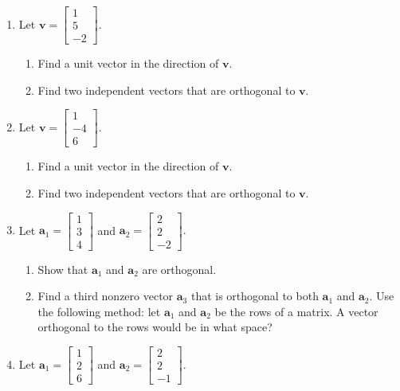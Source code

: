 \documentclass[
]{book}
\providecommand{\tightlist}{%
  \setlength{\itemsep}{0pt}\setlength{\parskip}{0pt}}
\theoremstyle{definition}
\theoremstyle{definition}
\theoremstyle{definition}
\theoremstyle{definition}
\theoremstyle{remark}
\begin{document}
\begin{enumerate}
\def\labelenumi{\arabic{enumi}.}
\item
  Let \(\mathbf{v}=\begin{bmatrix}1\\5\\-2\end{bmatrix}.\)

  \begin{enumerate}
  \def\labelenumii{\alph{enumii}.}
  \tightlist
  \item
    Find a unit vector in the direction of \(\mathbf{v}\).
  \item
    Find two independent vectors that are orthogonal to \(\mathbf{v}.\)
  \end{enumerate}
\item
  Let \(\mathbf{v}=\begin{bmatrix}1\\-4\\6\end{bmatrix}.\)

  \begin{enumerate}
  \def\labelenumii{\alph{enumii}.}
  \tightlist
  \item
    Find a unit vector in the direction of \(\mathbf{v}\).
  \item
    Find two independent vectors that are orthogonal to \(\mathbf{v}.\)
  \end{enumerate}
\item
  Let \(\mathbf{a}_1=\begin{bmatrix}1\\3\\4\end{bmatrix}\) and \(\mathbf{a}_2=\begin{bmatrix} 2\\2\\-2\end{bmatrix}.\)

  \begin{enumerate}
  \def\labelenumii{\alph{enumii}.}
  \tightlist
  \item
    Show that \(\mathbf{a}_1\) and \(\mathbf{a}_2\) are orthogonal.
  \item
    Find a third nonzero vector \(\mathbf{a}_3\) that is orthogonal to both \(\mathbf{a}_1\) and \(\mathbf{a}_2.\) Use the following method: let \(\mathbf{a}_1\) and \(\mathbf{a}_2\) be the rows of a matrix. A vector orthogonal to the rows would be in what space?
  \end{enumerate}
\item
  Let \(\mathbf{a}_1=\begin{bmatrix}1\\2\\6\end{bmatrix}\) and \(\mathbf{a}_2=\begin{bmatrix} 2\\2\\-1\end{bmatrix}.\)


\end{enumerate}
\end{document}

